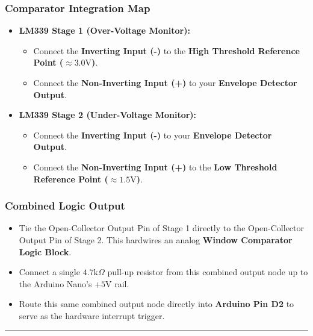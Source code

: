 \documentclass[
]{article}
\providecommand{\tightlist}{%
  \setlength{\itemsep}{0pt}\setlength{\parskip}{0pt}}
\begin{document}
\subsubsection{Comparator Integration
Map}\label{comparator-integration-map}

\begin{itemize}
\tightlist
\item
  \textbf{LM339 Stage 1 (Over-Voltage Monitor):}

  \begin{itemize}
  \tightlist
  \item
    Connect the \textbf{Inverting Input (-)} to the \textbf{High
    Threshold Reference Point (\(\approx 3.0\text{V}\))}.
  \item
    Connect the \textbf{Non-Inverting Input (+)} to your
    \textbf{Envelope Detector Output}.
  \end{itemize}
\item
  \textbf{LM339 Stage 2 (Under-Voltage Monitor):}

  \begin{itemize}
  \tightlist
  \item
    Connect the \textbf{Inverting Input (-)} to your \textbf{Envelope
    Detector Output}.
  \item
    Connect the \textbf{Non-Inverting Input (+)} to the \textbf{Low
    Threshold Reference Point (\(\approx 1.5\text{V}\))}.
  \end{itemize}
\end{itemize}

\subsubsection{Combined Logic Output}\label{combined-logic-output}

\begin{itemize}
\tightlist
\item
  Tie the Open-Collector Output Pin of Stage 1 directly to the
  Open-Collector Output Pin of Stage 2. This hardwires an analog
  \textbf{Window Comparator Logic Block}.
\item
  Connect a single \(4.7\text{k}\Omega\) pull-up resistor from this
  combined output node up to the Arduino Nano's \(+5\text{V}\) rail.
\item
  Route this same combined output node directly into \textbf{Arduino Pin
  D2} to serve as the hardware interrupt trigger.
\end{itemize}

\begin{center}\rule{0.5\linewidth}{0.5pt}\end{center}
\end{document}
